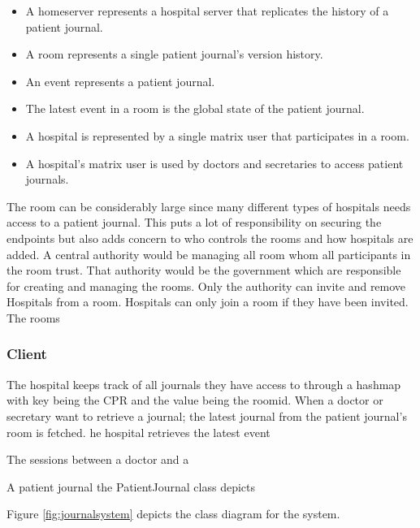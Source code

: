 \begin{itemize}
	\item A homeserver represents a hospital server that replicates the history of a patient journal. 
	\item A room represents a single patient journal's version history.
	\item An event represents a patient journal.  
	\item The latest event in a room is the global state of the patient journal.
	\item A hospital is represented by a single matrix user that participates in a room.
	\item A hospital's matrix user is used by doctors and secretaries to access patient journals. 
\end{itemize}


The room can be considerably large since many different types of hospitals needs access to a patient journal. This puts a lot of responsibility on securing the endpoints but also adds concern to who controls the rooms and how hospitals are added. A central authority would be managing all room whom all participants in the room trust. That authority would be the government which are responsible for creating and managing the rooms. Only the authority can invite and remove Hospitals from a room. Hospitals can only join a room if they have been invited. The rooms  


\subsubsection{Client}


 The hospital keeps track of all journals they have access to through a hashmap with key being the CPR and the value being the roomid. When a doctor or secretary want to retrieve a journal; the latest journal from the patient journal's room is fetched.
 he hospital retrieves the latest event 
 
 
 
The sessions between a doctor and a 

A patient journal the PatientJournal class depicts 

Figure \ref{fig:journalsystem} depicts the class diagram for the system.



